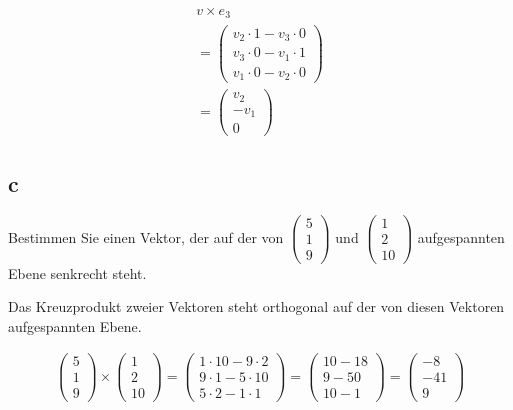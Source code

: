 \begin{align*}
    v \times e_3 \\
    = \begin{pmatrix}
        v_2 \cdot 1 - v_3 \cdot 0 \\
        v_3 \cdot 0 - v_1 \cdot 1 \\
        v_1 \cdot 0 - v_2 \cdot 0
    \end{pmatrix} \\
    = \begin{pmatrix}
        v_2 \\ -v_1 \\ 0
    \end{pmatrix}
\end{align*}

\subsection{c}
Bestimmen Sie einen Vektor, der auf der von $\begin{pmatrix}5 \\ 1 \\ 9\end{pmatrix}$ und $\begin{pmatrix}1 \\ 2 \\ 10\end{pmatrix}$ aufgespannten Ebene senkrecht steht.

Das Kreuzprodukt zweier Vektoren steht orthogonal auf der von diesen Vektoren aufgespannten Ebene.

\begin{align*}
    \begin{pmatrix}
        5 \\ 1 \\ 9
    \end{pmatrix} \times \begin{pmatrix}
        1 \\ 2 \\ 10
    \end{pmatrix} = \begin{pmatrix}
        1 \cdot 10 - 9 \cdot 2 \\
        9 \cdot 1 - 5 \cdot 10 \\
        5 \cdot 2 - 1 \cdot 1
    \end{pmatrix} = \begin{pmatrix}
        10 - 18 \\
        9 - 50 \\
        10 - 1
    \end{pmatrix} = \begin{pmatrix}
        -8 \\ -41 \\ 9
    \end{pmatrix}
\end{align*}


